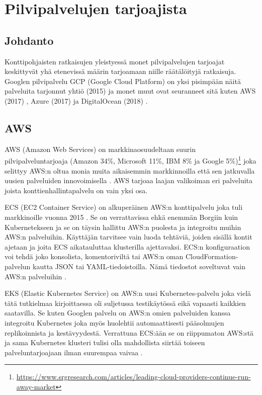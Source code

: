 \documentclass[finnish,gradu]{tktltiki3}
\begin{document}
    \section{Pilvipalvelujen tarjoajista}
    
    \subsection{Johdanto}
    
    Konttipohjaisten ratkaisujen yleistyessä monet pilvipalvelujen tarjoajat keskittyvät yhä etenevissä määrin tarjoamaan niille räätälöityjä ratkaisuja. Googlen pilvipalvelu GCP (Google Cloud Platform) on yksi pisimpään näitä palveluita tarjonnut yhtiö (2015) \cite{gcp-kubernetes} ja monet muut ovat seuranneet sitä kuten AWS (2017) \cite{aws-kubernetes}, Azure (2017) \cite{azure-kubernetes} ja DigitalOcean (2018) \cite{digital-ocean-kubernetes}.
    
    \subsection{AWS}
    \label{ch:aws}
    
    AWS (Amazon Web Services) on markkinaosuudeltaan suurin pilvipalveluntarjoaja (Amazon 34\%, Microsoft 11\%, IBM 8\% ja Google 5\%)\footnote{\url{https://www.srgresearch.com/articles/leading-cloud-providers-continue-run-away-market}} joka selittyy AWS:n oltua monia muita aikaisemmin markkinnoilla että sen jatkuvalla uusien palveluiden innovoimisella \cite{aws-leading-cloud}. AWS tarjoaa laajan valikoiman eri palveluita joista konttienhallintapalvelu on vain yksi osa.
    
    ECS (EC2 Container Service) on alkuperäinen AWS:n konttipalvelu joka tuli markkinoille vuonna 2015 \cite{aws-introducing-ecs}. Se on verrattavissa ehkä enemmän Borgiin kuin Kubernetekseen ja se on täysin hallittu AWS:n puolesta ja integroitu muihin AWS:n palveluihin. Käyttäjän tarvitsee vain luoda tehtäviä, joiden sisällä kontit ajetaan ja joita ECS aikatauluttaa klusterilla ajettavaksi. ECS:n konfiguraation voi tehdä joko konsolista, komentoriviltä tai AWS:n oman CloudFormation-palvelun kautta JSON tai YAML-tiedoistoilla. Nämä tiedostot soveltuvat vain AWS:n palveluihin \cite{aws-docs-ecs}.
    
    EKS (Elastic Kubernetes Service) on AWS:n uusi Kubernetes-palvelu joka vielä tätä tutkielmaa kirjoittaessa oli suljetussa testikäytössä eikä vapaasti kaikkien saatavilla. Se kuten Googlen palvelu on AWS:n omien palveluiden kanssa integroitu Kubernetes joka myös huolehtii automaattisesti pääsolmujen replikoinnista ja kestävyydestä. Verrattuna ECS:ään se on riippumaton AWS:stä ja sama Kubernetes klusteri tulisi olla mahdollista siirtää toiseen palveluntarjoajaan ilman suurempaa vaivaa \cite{aws-docs-eks}.
    
\end{document}
